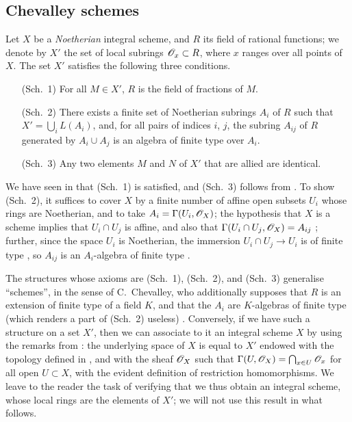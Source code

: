 \subsection{Chevalley schemes}
\label{subsection:I.8.3}

\begin{env}[8.3.1]
\label{I.8.3.1}
Let $X$ be a \emph{Noetherian} integral scheme, and $R$ its field of rational functions;
we denote by $X'$ the set of local subrings $\mathscr{O}_x\subset R$, where $x$ ranges over all points of $X$.
The set $X'$ satisfies the following three conditions.
\begin{enumerate}
  \item[(Sch.~1)] For all $M\in X'$, $R$ is the field of fractions of $M$.
  \item[(Sch.~2)] There exists a finite set of Noetherian subrings $A_i$ of $R$ such that $X'=\bigcup_i L(A_i)$, and, for all pairs of indices $i$, $j$, the subring $A_{ij}$ of $R$ generated by $A_i\cup A_j$ is an algebra of finite type over $A_i$.
  \item[(Sch.~3)] Any two elements $M$ and $N$ of $X'$ that are allied are identical.
\end{enumerate}
\end{env}

We have seen in  that (Sch.~1) is satisfied, and (Sch.~3) follows from .
To show (Sch.~2), it suffices to cover $X$ by a finite number of affine open subsets $U_i$ whose rings are Noetherian, and to take $A_i=\Gamma(U_i,\mathscr{O}_X)$;
the hypothesis that $X$ is a scheme implies that $U_i\cap U_j$ is affine, and also that $\Gamma(U_i\cap U_j,\mathscr{O}_X)=A_{ij}$ ;
further, since the space $U_i$ is Noetherian, the immersion $U_i\cap U_j\to U_i$ is of finite type , so $A_{ij}$ is an $A_i$-algebra of finite type .

\begin{env}[8.3.2]
\label{I.8.3.2}
The structures whose axioms are (Sch.~1), (Sch.~2), and (Sch.~3) generalise ``schemes'', in the sense of C.~Chevalley, who additionally supposes that $R$ is an extension of finite type of a field $K$, and that the $A_i$ are $K$-algebras of finite type (which renders a part of (Sch.~2) useless) \cite{I-1}.
Conversely, if we have such a structure on a set $X'$, then we can associate to it an integral scheme $X$ by using the remarks from : the underlying space of $X$ is equal to $X'$ endowed with the topology defined in , and with the sheaf $\mathscr{O}_X$ such that $\Gamma(U,\mathscr{O}_X)=\bigcap_{x\in U}\mathscr{O}_x$ for all open $U\subset X$, with the evident definition of restriction homomorphisms.
We leave to the reader the task of verifying that we thus obtain an integral scheme, whose local rings are the elements of $X'$;
we will not use this result in what follows.
\end{env}

